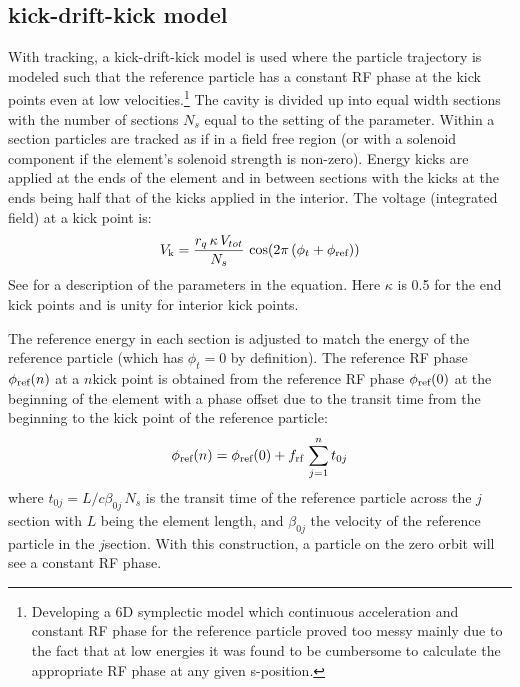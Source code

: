 \subsection{kick-drift-kick model}

With  tracking, a kick-drift-kick model is used where the particle trajectory is modeled
such that the reference particle has a constant RF phase at the kick points even at low
velocities.\footnote
  {
Developing a 6D symplectic model which continuous acceleration and constant RF phase for the
reference particle proved too messy mainly due to the fact that at low energies it was found to
be cumbersome to calculate the appropriate RF phase at any given s-position.
  }
The cavity is divided up into equal width sections with the number of sections $N_s$ equal to the
setting of the  parameter. Within a section particles are tracked as if in a field
free region (or with a solenoid component if the element's solenoid strength is non-zero). Energy
kicks are applied at the ends of the element and in between sections with the kicks at the ends
being half that of the kicks applied in the interior. The voltage (integrated field) at a kick point
is:
\begin{equation}
  V_{\text{k}} = \frac{r_q \, \kappa \, V_{tot}}{N_s} \, \cos(2 \pi \, (\phi_t + \phi_{\text{ref}}))
  \label{vkrq}
\end{equation}
See  for a description of the parameters in the equation. Here $\kappa$ is 0.5 for the end
kick points and is unity for interior kick points.

The reference energy in each section is adjusted to match the energy of the reference particle
(which has $\phi_t = 0$ by definition).  The reference RF phase $\phi_{\text{ref}}(n)$ at a $n$\Th kick
point is obtained from the reference RF phase $\phi_{\text{ref}}(0)$ at the beginning of the element with a
phase offset due to the transit time from the beginning to the kick point of the reference particle:
\begin{equation}
  \phi_{\text{ref}}(n) = \phi_{\text{ref}}(0) + f_\text{rf} \, \sum_{j = 1}^n t_{0j}
\end{equation}
where $t_{0j} = L / c \beta_{0j} \, N_s$ is the transit time of the reference particle across the
$j$\Th section with $L$ being the element length, and $\beta_{0j}$ the velocity of the reference
particle in the $j$\Th section. With this construction, a particle on the zero orbit will see a
constant RF phase.

